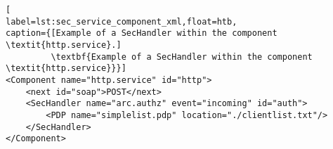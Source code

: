 %
%
%
\begin{lstlisting}[
label=lst:sec_service_component_xml,float=htb,
caption={[Example of a SecHandler within the component \textit{http.service}.]
         \textbf{Example of a SecHandler within the component \textit{http.service}}}]
<Component name="http.service" id="http">
	<next id="soap">POST</next>
	<SecHandler name="arc.authz" event="incoming" id="auth">
		<PDP name="simplelist.pdp" location="./clientlist.txt"/>
	</SecHandler>
</Component>
\end{lstlisting}




